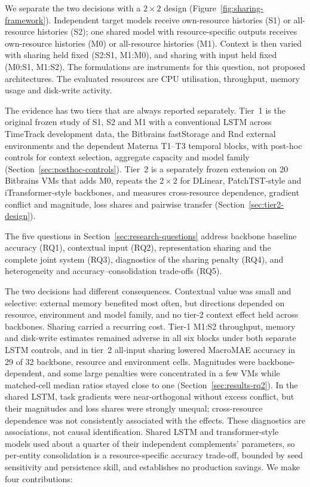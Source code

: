 \documentclass[a4paper,fleqn]{cas-dc}
\begin{document}
We separate the two decisions with a $2\times2$ design
(Figure~\ref{fig:sharing-framework}). Independent target models receive
own-resource histories (S1) or all-resource histories (S2); one shared model
with resource-specific outputs receives own-resource histories (M0) or
all-resource histories (M1). Context is then varied with sharing held fixed
(S2:S1, M1:M0), and sharing with input held fixed (M0:S1, M1:S2). The
formulations are instruments for this question, not proposed architectures.
The evaluated resources are CPU utilisation, throughput, memory usage and
disk-write activity.

The evidence has two tiers that are always reported separately. Tier~1 is
the original frozen study of S1, S2 and M1 with a conventional LSTM across
TimeTrack development data, the Bitbrains fastStorage and Rnd external
environments and the dependent Materna T1--T3 temporal blocks, with
post-hoc controls for context selection, aggregate capacity and model family
(Section~\ref{sec:posthoc-controls}). Tier~2 is a separately frozen
extension on 20 Bitbrains VMs that adds M0, repeats the $2\times2$ for
DLinear, PatchTST-style and iTransformer-style backbones, and measures
cross-resource dependence, gradient conflict and magnitude, loss shares and
pairwise transfer (Section~\ref{sec:tier2-design}).

The five questions in Section~\ref{sec:research-questions} address backbone
baseline accuracy (RQ1), contextual input (RQ2), representation sharing and
the complete joint system (RQ3), diagnostics of the sharing penalty (RQ4), and
heterogeneity and accuracy--consolidation trade-offs (RQ5).

The two decisions had different consequences. Contextual value was small
and selective: external memory benefited most often, but directions depended
on resource, environment and model family, and no tier-2 context effect held
across backbones. Sharing carried a recurring cost. Tier-1 M1:S2 throughput,
memory and disk-write estimates remained adverse in all six blocks under both
separate LSTM controls, and in tier~2 all-input sharing lowered MacroMAE
accuracy in 29 of 32 backbone, resource and environment cells. Magnitudes
were backbone-dependent, and some large penalties were concentrated in a few
VMs while matched-cell median ratios stayed close to one
(Section~\ref{sec:results-rq2}). In the shared LSTM, task gradients were
near-orthogonal without excess conflict, but their magnitudes and loss
shares were strongly unequal; cross-resource dependence was not
consistently associated with the effects. These diagnostics are associations, not causal identification.
Shared LSTM and transformer-style models used about a quarter of their
independent complements' parameters, so per-entity consolidation is a
resource-specific accuracy trade-off, bounded by seed sensitivity and
persistence skill, and establishes no production savings. We make four
contributions:
\end{document}
